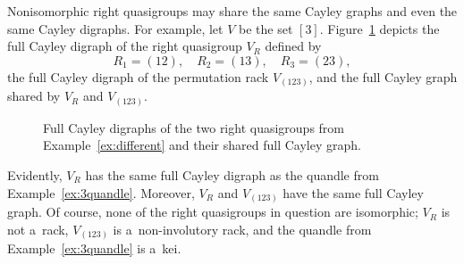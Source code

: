 \documentclass{jonasart}
\begin{document}
	\begin{example}\label{ex:different}
		Nonisomorphic right quasigroups may share the same Cayley graphs and even the same Cayley digraphs. For example, let $V$ be the set $[3]$. Figure~\ref{fig:different} depicts the full Cayley digraph of the right quasigroup $V_R$ defined by
		\[
			R_1=(12),\quad R_2=(13),\quad R_3=(23),
		\]
		the full Cayley digraph of the permutation rack $V_{(123)}$, and the full Cayley graph shared by $V_R$ and $V_{(123)}$.
		\begin{figure}[!ht]
			\centering
			\caption{Full Cayley digraphs of the two right quasigroups from Example~\ref{ex:different} and their shared full Cayley graph.}
			\label{fig:different}
		\end{figure}
		Evidently, $V_R$ has the same full Cayley digraph as the quandle from Example~\ref{ex:3quandle}. Moreover, $V_R$ and $V_{(123)}$ have the same full Cayley graph. Of course, none of the right quasigroups in question are isomorphic; $V_R$ is not a~rack, $V_{(123)}$ is a~non-involutory rack, and the quandle from Example~\ref{ex:3quandle} is a~kei.
	\end{example}
\end{document}
